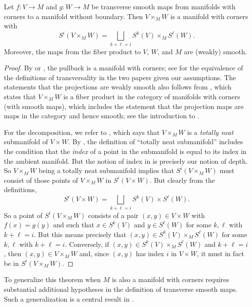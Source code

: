 \begin{theorem}\label{pullback}
	Let $f \colon V \to M$ and $g \colon W \to M$ be transverse smooth maps from manifolds with corners to a manifold without boundary.
	Then $V \times _M W$ is a manifold with corners with
	\begin{equation*}
		S^i(V \times _M W) = \bigsqcup_{k + \ell = i} S^k(V) \times_M S^\ell(W).
	\end{equation*}
	Moreover, the maps from the fiber product to $V$, $W$, and $M$ are (weakly) smooth.
\end{theorem}
\begin{proof}
By  \cite[Theorem 6.4]{Joy12} or \cite[Theorem 7.2.7]{MaDo92}, the pullback is a manifold with corners; see \cite[Remark 6.3]{Joy12} for the equivalence of the definitions of transversality in the two papers given our assumptions. The statements that the projections are weakly smooth also follows from \cite[Theorem 6.4]{Joy12}, which states that $V\times_MW$ is a fiber product in the category of manifolds with corners (with smooth maps), which includes the statement that the projection maps are maps in the category and hence smooth; see the introduction to \cite[Section 6]{Joy12}. 

For the decomposition, we refer to \cite[Theorem 7.2.7.a]{MaDo92}, which says that $V\times_MW$ is a \textit{totally neat} submanifold of $V\times W$. By \cite[Definition 3.1.10]{MaDo92}, the definition of ``totally neat submanifold'' includes the condition that the \textit{index} of a point in the submanifold is equal to its index in the ambient manifold. But the notion of index in \cite{MaDo92} is precisely our notion of depth. So $V\times_MW$ being a totally neat submanifold implies that $S^i(V\times_MW)$ must consist of those points of $V\times_MW$ in $S^i(V\times W)$.  But clearly from the definitions, 
$$S^i(V\times W)=\bigsqcup_{k + \ell = i} S^k(V) \times S^\ell(W).$$
So a point of $S^i(V\times_M W)$ consists of a pair $(x,y)\in V\times W$ with $f(x)=g(y)$ and such that $x\in S^k(V)$ and $y\in S^\ell(W)$ for some $k,\ell$ with $k+\ell=i$. But this means precisely that $(x,y)\in S^k(V) \times_M S^\ell(W)$ for some $k,\ell$ with $k+\ell=i$. Conversely, if $(x,y)\in S^k(V) \times_M S^\ell(W)$ and $k+\ell=i$, then $(x,y)\in V\times_MW$ and, since $(x,y)$ has index $i$ in $V\times W$, it must in fact be in $S^i(V\times_M W)$.
\end{proof}


To generalize this theorem when $M$ is also a manifold with corners requires substantial additional hypotheses in the definition of transverse smooth maps.
Such a generalization is a central result in \cite{Joy12}.

